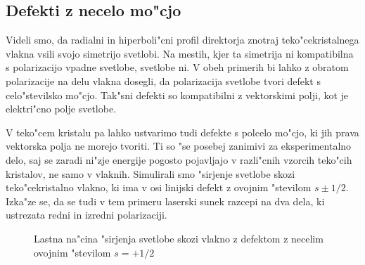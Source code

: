 \documentclass[a4paper,10pt]{article}
\begin{document}
\subsection{Defekti z necelo mo"cjo}

Videli smo, da radialni in hiperboli"cni profil direktorja znotraj teko"cekristalnega vlakna vsili svojo simetrijo svetlobi. 
Na mestih, kjer ta simetrija ni kompatibilna s polarizacijo vpadne svetlobe, svetlobe ni. 
V obeh primerih bi lahko z obratom polarizacije na delu vlakna dosegli, da polarizacija svetlobe tvori defekt s celo"stevilsko mo"cjo. 
Tak"sni defekti so kompatibilni z vektorskimi polji, kot je elektri"cno polje svetlobe. 

V teko"cem kristalu pa lahko ustvarimo tudi defekte s polcelo mo"cjo, ki jih prava vektorska polja ne morejo tvoriti. 
Ti so "se posebej zanimivi za eksperimentalno delo, saj se zaradi ni"zje energije pogosto pojavljajo v razli"cnih vzorcih teko"cih kristalov, ne samo v vlaknih. 
Simulirali smo "sirjenje svetlobe skozi teko"cekristalno vlakno, ki ima v osi linijski defekt z ovojnim "stevilom $s \pm 1/2$. 
Izka"ze se, da se tudi v tem primeru laserski sunek razcepi na dva dela, ki ustrezata redni in izredni polarizaciji. 

\begin{figure}[!htbp]
 \centering
 \caption{Lastna na"cina "sirjenja svetlobe skozi vlakno z defektom z necelim ovojnim "stevilom $s=+1/2$}
 \label{fig:pulse-p12-mode}
\end{figure}
\end{document}
